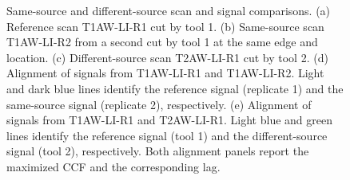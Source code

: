 \documentclass[11pt,a4paper]{article}
\begin{document}
\begin{figure}[hbt]
\begin{minipage}[t]{\linewidth}
{}

\subcaption{\label{fig-T1AW-LI-R1-T2AW-LI-R1}}

\end{minipage}%

\caption{\label{fig-same-different-source-alignment}Same-source and
different-source scan and signal comparisons. (a) Reference scan
T1AW-LI-R1 cut by tool 1. (b) Same-source scan T1AW-LI-R2 from a second
cut by tool 1 at the same edge and location. (c) Different-source scan
T2AW-LI-R1 cut by tool 2. (d) Alignment of signals from T1AW-LI-R1 and
T1AW-LI-R2. Light and dark blue lines identify the reference signal
(replicate 1) and the same-source signal (replicate 2), respectively.
(e) Alignment of signals from T1AW-LI-R1 and T2AW-LI-R1. Light blue and
green lines identify the reference signal (tool 1) and the
different-source signal (tool 2), respectively. Both alignment panels
report the maximized CCF and the corresponding lag.}

\end{figure}%
\end{document}
